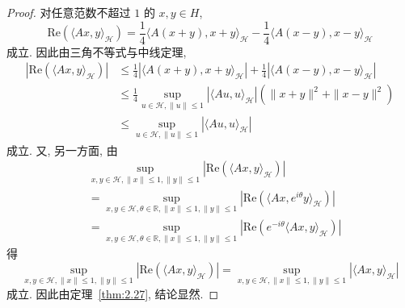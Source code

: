 \begin{proof}
对任意范数不超过 $1$ 的 $x, y \in H$,
\[
\mathrm{Re}(\langle Ax, y \rangle_{\mathcal{H}}) = \frac{1}{4}\langle A(x + y), x + y \rangle_{\mathcal{H}} - \frac{1}{4}\langle A(x - y), x - y \rangle_{\mathcal{H}}
\]
成立. 因此由三角不等式与中线定理,
\begin{align*}
|\mathrm{Re}(\langle Ax, y \rangle_{\mathcal{H}})| &\leq \frac{1}{4}|\langle A(x + y), x + y \rangle_{\mathcal{H}}| + \frac{1}{4}|\langle A(x - y), x - y \rangle_{\mathcal{H}}| \\
&\leq \frac{1}{4}\sup_{u \in \mathcal{H}, \|u\| \leq 1}|\langle Au, u \rangle_{\mathcal{H}}|(\|x + y\|^{2} + \|x - y\|^{2}) \\
&\leq \sup_{u \in \mathcal{H}, \|u\| \leq 1}|\langle Au, u \rangle_{\mathcal{H}}|
\end{align*}
成立. 又, 另一方面, 由
\begin{align*}
&\sup_{x, y \in \mathcal{H}, \|x\| \leq 1, \|y\| \leq 1}|\mathrm{Re}(\langle Ax, y \rangle_{\mathcal{H}})| \\
&= \sup_{x, y \in \mathcal{H}, \theta \in \mathbb{R}, \|x\| \leq 1, \|y\| \leq 1}|\mathrm{Re}(\langle Ax, e^{i\theta}y \rangle_{\mathcal{H}})| \\
&= \sup_{x, y \in \mathcal{H}, \theta \in \mathbb{R}, \|x\| \leq 1, \|y\| \leq 1}|\mathrm{Re}(e^{-i\theta}\langle Ax, y \rangle_{\mathcal{H}})|
\end{align*}
得
\[
\sup_{x, y \in \mathcal{H}, \|x\| \leq 1, \|y\| \leq 1}|\mathrm{Re}(\langle Ax, y \rangle_{\mathcal{H}})| = \sup_{x, y \in \mathcal{H}, \|x\| \leq 1, \|y\| \leq 1}|\langle Ax, y \rangle_{\mathcal{H}}|
\]
成立. 因此由定理~\ref{thm:2.27}, 结论显然.
\end{proof}
